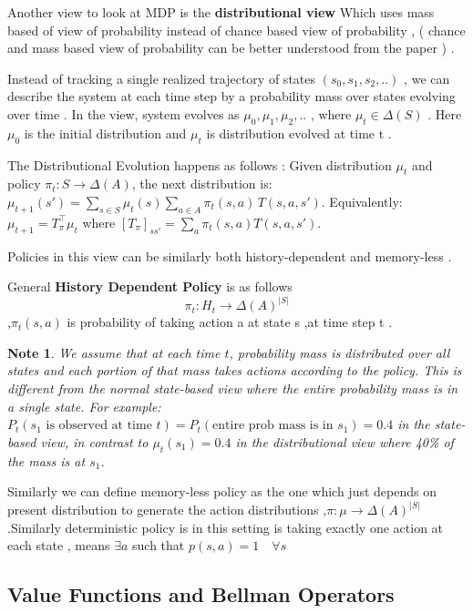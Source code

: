 \documentclass{article}
\newtheorem{note}{Note}
\begin{document}
Another view to look at MDP is the \textbf{distributional view} Which uses mass based of view of probability instead of chance based view of probability , ( chance and mass based view of probability can be better understood from the paper \citep{tsai2025chancemassinterpretationsprobabilities} ) .


Instead of tracking a single realized trajectory of states $(s_0,s_1,s_2,..)$ , we can describe the system at each time step by a probability mass over states evolving over time .  In the view, system evolves as $\mu_0,\mu_1,\mu_2,..$ , where $\mu_t \in \Delta(S) $ . Here $\mu_0$ is the initial distribution and $\mu_t$ is distribution evolved at time t .

The Distributional Evolution happens as follows :
Given distribution $\mu_t$ and policy $\pi_t: S \to \Delta(A)$, the next distribution is:
$\mu_{t+1}(s') = \sum_{s \in S} \mu_t(s) \sum_{a \in A} \pi_t(s,a) \, T(s,a,s')$.
Equivalently: $\mu_{t+1} = T_\pi^\top \mu_t$ where $[T_\pi]_{ss'} = \sum_a \pi_t(s,a) T(s,a,s')$.



Policies in this view can be similarly both history-dependent and memory-less .

General \textbf{History Dependent Policy} is as follows $$\pi_t : H_t \to \Delta(A)^{|S|}$$ ,$\pi_t(s,a)$ is probability of taking action a at state s ,at time step t .

\begin{note}
We assume that at each time $t$, probability mass is distributed over all states and each portion of that mass takes actions according to the policy. This is different from the normal state-based view where the entire probability mass is in a single state. For example: $P_t(s_1 \text{ is observed at time } t) = P_t(\text{entire prob mass is in } s_1) = 0.4$ in the state-based view, in contrast to $\mu_t(s_1) = 0.4$ in the distributional view where 40\% of the mass is at $s_1$.
\end{note} 

Similarly we can define memory-less policy as the one which just depends on present distribution to generate the action distributions ,$\pi : \mu \to \Delta(A)^{|S|}$ .Similarly deterministic policy is in this setting is taking exactly one action at each state , means $\exists a $ such that $p(s,a) = 1 \quad \forall s$ 


\subsection{Value Functions and Bellman Operators}
\end{document}

